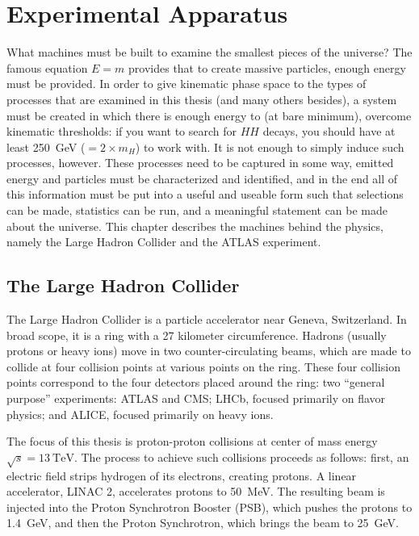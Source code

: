 \chapter{Experimental Apparatus}
\label{chap:experiment}

What machines must be built to examine the smallest pieces of the universe? The famous equation 
$E = m$ provides that to create massive particles, enough energy must be provided. In order to give 
kinematic phase space to the types of processes that are examined in this thesis (and many others besides),
a system must be created in which there is enough energy to (at bare minimum), overcome kinematic thresholds:
if you want to search for $HH$ decays, you should have at least \SI{250}{\GeV} ($= 2\times m_{H}$) to work with.
It is not enough to simply induce such processes, however. These processes need to be captured in some way, emitted 
energy and particles must be characterized and identified, and in the end all of this information must be put into a 
useful and useable form such that selections can be made, statistics can be run, and a meaningful statement 
can be made about the universe. This chapter describes the machines behind the physics, namely the Large 
Hadron Collider and the ATLAS experiment.

\section{The Large Hadron Collider}
The Large Hadron Collider is a particle accelerator near Geneva, Switzerland. In broad scope, it is a 
ring with a 27 kilometer circumference. Hadrons (usually protons or heavy ions) move in two 
counter-circulating beams, which are made to collide at four collision points at various 
points on the ring. These four collision points correspond to the four detectors placed 
around the ring: two ``general purpose'' experiments: ATLAS and CMS; LHCb, focused primarily 
on flavor physics; and ALICE, focused primarily on heavy ions.

The focus of this thesis is proton-proton collisions at center of mass energy $\sqrt{s}=\SI{13}{\TeV}$. 
The process to achieve such collisions proceeds as follows:
first, an electric field strips hydrogen of its electrons, creating protons. A linear accelerator,
LINAC 2, accelerates protons to \SI{50}{\MeV}. The resulting beam is injected into the Proton 
Synchrotron Booster (PSB), which pushes the protons to \SI{1.4}{\GeV}, and then the Proton Synchrotron,
which brings the beam to \SI{25}{\GeV}.

